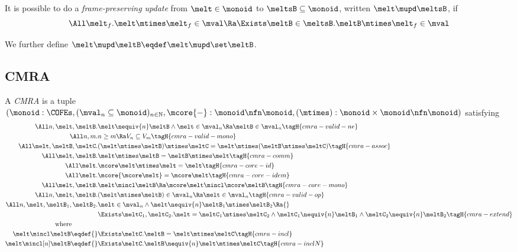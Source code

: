 \begin{defn}
  It is possible to do a \emph{frame-preserving update} from $\melt \in \monoid$ to $\meltsB \subseteq \monoid$, written $\melt \mupd \meltsB$, if
  \[ \All \melt_f. \melt \mtimes \melt_f \in \mval \Ra \Exists \meltB \in \meltsB. \meltB \mtimes \melt_f \in \mval \]

  We further define $\melt \mupd \meltB \eqdef \melt \mupd \set\meltB$.
\end{defn}



\subsection{CMRA}

\begin{defn}
  A \emph{CMRA} is a tuple $(\monoid : \COFEs, (\mval_n \subseteq \monoid)_{n \in \mathbb{N}}, \mcore{-}: \monoid \nfn \monoid, (\mtimes) : \monoid \times \monoid \nfn \monoid)$ satisfying
  \begin{align*}
    \All n, \melt, \meltB.& \melt \nequiv{n} \meltB \land \melt\in\mval_n \Ra \meltB\in\mval_n \tagH{cmra-valid-ne} \\
    \All n, m.& n \geq m \Ra V_n \subseteq V_m \tagH{cmra-valid-mono} \\
    \All \melt, \meltB, \meltC.& (\melt \mtimes \meltB) \mtimes \meltC = \melt \mtimes (\meltB \mtimes \meltC) \tagH{cmra-assoc} \\
    \All \melt, \meltB.& \melt \mtimes \meltB = \meltB \mtimes \melt \tagH{cmra-comm} \\
    \All \melt.& \mcore\melt \mtimes \melt = \melt \tagH{cmra-core-id} \\
    \All \melt.& \mcore{\mcore\melt} = \mcore\melt \tagH{cmra-core-idem} \\
    \All \melt, \meltB.& \melt \mincl \meltB \Ra \mcore\melt \mincl \mcore\meltB \tagH{cmra-core-mono} \\
    \All n, \melt, \meltB.& (\melt \mtimes \meltB) \in \mval_n \Ra \melt \in \mval_n \tagH{cmra-valid-op} \\
    \All n, \melt, \meltB_1, \meltB_2.& \omit\rlap{$\melt \in \mval_n \land \melt \nequiv{n} \meltB_1 \mtimes \meltB_2 \Ra {}$} \\
    &\Exists \meltC_1, \meltC_2. \melt = \meltC_1 \mtimes \meltC_2 \land \meltC_1 \nequiv{n} \meltB_1 \land \meltC_2 \nequiv{n} \meltB_2 \tagH{cmra-extend} \\
    \text{where}\qquad\qquad\\
    \melt \mincl \meltB \eqdef{}& \Exists \meltC. \meltB = \melt \mtimes \meltC \tagH{cmra-incl}\\
    \melt \mincl[n] \meltB \eqdef{}& \Exists \meltC. \meltB \nequiv{n} \melt \mtimes \meltC \tagH{cmra-inclN}
  \end{align*}
\end{defn}

